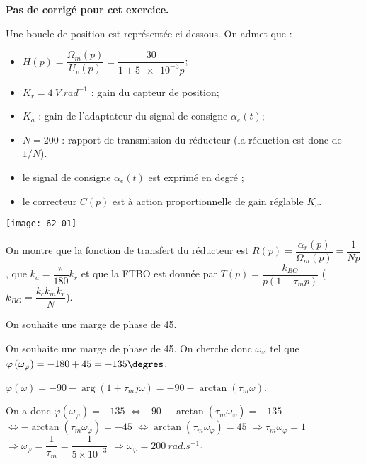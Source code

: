 \normaltrue \difficilefalse \tdifficilefalse
\correctiontrue

\setcounter{question}{0}

\ifcorrection
\else
\textbf{Pas de corrigé pour cet exercice.}
\fi


\ifprof 
\else
Une boucle de position est représentée ci-dessous. On admet que :  
\begin{itemize}
\item $H(p)=\dfrac{\Omega_m(p)}{U_v(p)}=\dfrac{30}{1+\num{5e-3}p}$;
\item $K_r = \SI{4}{V.rad^{-1}}$ : gain du capteur de position;
\item $K_a$ : gain de l’adaptateur du signal de consigne $\alpha_e(t)$; 
\item $N=200$ : rapport de transmission du réducteur (la réduction est donc de $1/N$).
\item le signal de consigne $\alpha_e(t)$ est exprimé en degré ; 
\item le correcteur $C(p)$ est à action proportionnelle de gain réglable $K_c$. 
\end{itemize}


\begin{center}
\texttt{[image: 62\_01]}
\end{center}
 \fi
 
 
 On montre que la fonction de transfert du réducteur est $R(p)=\dfrac{\alpha_r(p)}{\Omega_m(p)}=\dfrac{1}{Np}$, que  $k_a=\dfrac{\pi}{180}k_r$ et que la FTBO est donnée par $T(p)=\dfrac{k_{BO}}{p\left(1+\tau_m p\right)}$ ($k_{BO}=\dfrac{k_c k_m k_r}{N}$).
 
 
 On souhaite une marge de phase de 45\degres.
 
\ifprof
On souhaite une marge de phase de 45\degres. On cherche donc $\omega_{\varphi}$ tel que 
$\varphi\left(\omega_{\varphi}\right)=-180+45 = -135\degres$.

$\varphi(\omega)=-90-\arg\left(1+\tau_m j \omega \right) =-90-\arctan\left(\tau_m  \omega \right)  $.

On a donc $\varphi\left(\omega_{\varphi}\right)=-135$
$\Leftrightarrow -90-\arctan\left(\tau_m  \omega_{\varphi}\right)  = -135 $
$\Leftrightarrow -\arctan\left(\tau_m  \omega_{\varphi} \right)  = -45 $
$\Leftrightarrow \arctan\left(\tau_m  \omega_{\varphi} \right)  = 45 $
$\Rightarrow \tau_m  \omega_{\varphi} = 1 $
$\Rightarrow \omega_{\varphi}  = \dfrac{1}{\tau_m}= \dfrac{1}{5\times 10^{-3}}$
$\Rightarrow \omega_{\varphi}  = \SI{200}{rad.s^{-1}}$.


